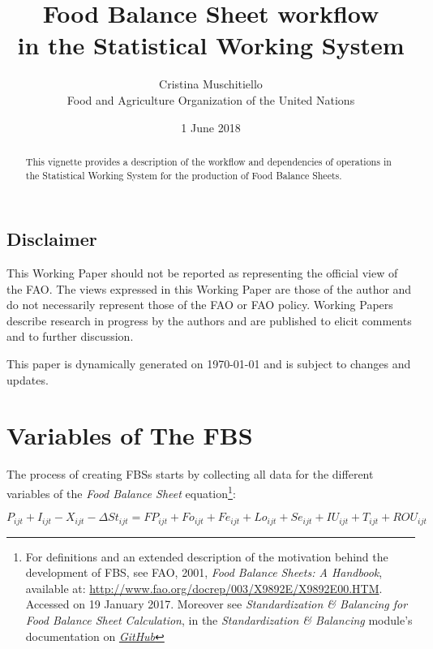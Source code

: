 \documentclass[]{article}
\title{Food Balance Sheet workflow\\
in the Statistical Working System}
\author{Cristina Muschitiello\\
Food and Agriculture Organization of the United Nations}
\date{1 June 2018}
\let\rmarkdownfootnote\footnote%
\def\footnote{\protect\rmarkdownfootnote}
\begin{document}
\maketitle
\begin{abstract}
This vignette provides a description of the workflow and dependencies of
operations in the Statistical Working System for the production of Food
Balance Sheets.
\end{abstract}

{
\setcounter{tocdepth}{4}
\tableofcontents
}
\listoftables

\listoffigures

\newpage

\subsection*{Disclaimer}\label{disclaimer}

This Working Paper should not be reported as representing the official
view of the FAO. The views expressed in this Working Paper are those of
the author and do not necessarily represent those of the FAO or FAO
policy. Working Papers describe research in progress by the authors and
are published to elicit comments and to further discussion.

This paper is dynamically generated on \today{} and is subject to
changes and updates.

\section*{Variables of The FBS}\label{variables-of-the-fbs}

The process of creating FBSs starts by collecting all data for the
different variables of the \emph{Food Balance Sheet} equation\footnote{For
  definitions and an extended description of the motivation behind the
  development of FBS, see FAO, 2001, \emph{Food Balance Sheets: A
  Handbook}, available at:
  \url{http://www.fao.org/docrep/003/X9892E/X9892E00.HTM}. Accessed on
  19 January 2017. Moreover see \emph{Standardization \& Balancing for
  Food Balance Sheet Calculation}, in the \emph{Standardization \&
  Balancing} module's documentation on
  \href{https://github.com/SWS-Methodology/faoswsStandardization/tree/master/documentation}{\emph{GitHub}}}:

\begin{equation}
\label{eq:balance1}
P_{ijt} + I_{ijt} - X_{ijt} - \Delta St_{ijt} = FP_{ijt} + Fo_{ijt} + Fe_{ijt} + Lo_{ijt} + Se_{ijt} + IU_{ijt} + T_{ijt}  + ROU_{ijt}
\end{equation}
\end{document}
